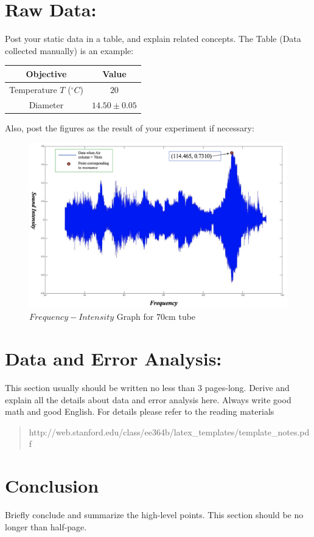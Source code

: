 \section{Raw Data:}
Post your static data in a table, and explain related concepts. The Table (Data collected manually) is an example:
\begin{center}
\begin{tabular}{|c | c|}
\hline
Objective   &  Value \\
\hline
Temperature $T$ ($^{\circ}C$)  &  $20$\\
\hline
Diameter  &  $14.50 \pm0.05$\\
\hline
\end{tabular}
\label{Data collected manually}
\end{center}

Also, post the figures as the result of your experiment if necessary:

\begin{figure}[H]
\centering\includegraphics[width=13cm]{Exp_9_graph}
\caption{$Frequency-Intensity$ Graph for $70$cm tube}
\label{$Frequency-Intensity$ Graph for $70$cm tube}
\end{figure}


\section{Data and Error Analysis:}
This section usually should be written no less than 3 pages-long. Derive and explain all the details about data and error analysis here. Always write good math and good English. For details please refer to the reading materials
\begin{quotation}
http://web.stanford.edu/class/ee364b/latex_templates/template_notes.pdf
\end{quotation}

\section{Conclusion}
Briefly conclude and summarize the high-level points. This section should be no longer than half-page.







